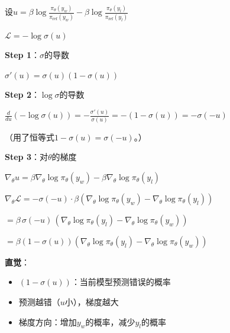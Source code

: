 \documentclass[11pt,a4paper]{article}
\theoremstyle{definition}
\begin{document}
\begin{calculation}[DPO梯度的详细推导]
设$u = \beta \log \frac{\pi_\theta(y_w)}{\pi_{\text{ref}}(y_w)} - \beta \log \frac{\pi_\theta(y_l)}{\pi_{\text{ref}}(y_l)}$

$\mathcal{L} = -\log \sigma(u)$

\textbf{Step 1}：$\sigma$的导数

$\sigma'(u) = \sigma(u)(1 - \sigma(u))$

\textbf{Step 2}：$\log \sigma$的导数

$\frac{d}{du}(-\log \sigma(u)) = -\frac{\sigma'(u)}{\sigma(u)} = -(1 - \sigma(u)) = -\sigma(-u)$

（用了恒等式$1-\sigma(u)=\sigma(-u)$。）

\textbf{Step 3}：对$\theta$的梯度

$\nabla_\theta u = \beta \nabla_\theta \log \pi_\theta(y_w) - \beta \nabla_\theta \log \pi_\theta(y_l)$

$\nabla_\theta \mathcal{L} = -\sigma(-u) \cdot \beta (\nabla_\theta \log \pi_\theta(y_w) - \nabla_\theta \log \pi_\theta(y_l))$

$= \beta\,\sigma(-u)\, (\nabla_\theta \log \pi_\theta(y_l) - \nabla_\theta \log \pi_\theta(y_w))$

$= \beta (1 - \sigma(u)) (\nabla_\theta \log \pi_\theta(y_l) - \nabla_\theta \log \pi_\theta(y_w))$

\textbf{直觉}：
\begin{itemize}
    \item $(1 - \sigma(u))$：当前模型预测错误的概率
    \item 预测越错（$u$小），梯度越大
    \item 梯度方向：增加$y_w$的概率，减少$y_l$的概率
\end{itemize}
\end{calculation}
\end{document}
